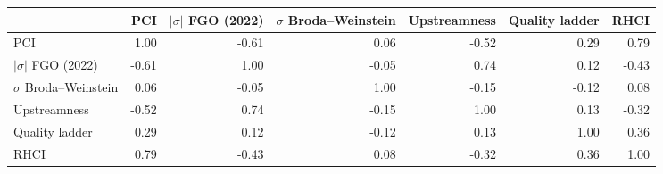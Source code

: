 \begin{tabular}{lrrrrrr}
\toprule
 & PCI & $|\sigma|$ FGO (2022) & $\sigma$ Broda--Weinstein & Upstreamness & Quality ladder & RHCI \\
\midrule
PCI & 1.00 & -0.61 & 0.06 & -0.52 & 0.29 & 0.79 \\
$|\sigma|$ FGO (2022) & -0.61 & 1.00 & -0.05 & 0.74 & 0.12 & -0.43 \\
$\sigma$ Broda--Weinstein & 0.06 & -0.05 & 1.00 & -0.15 & -0.12 & 0.08 \\
Upstreamness & -0.52 & 0.74 & -0.15 & 1.00 & 0.13 & -0.32 \\
Quality ladder & 0.29 & 0.12 & -0.12 & 0.13 & 1.00 & 0.36 \\
RHCI & 0.79 & -0.43 & 0.08 & -0.32 & 0.36 & 1.00 \\
\bottomrule
\end{tabular}
